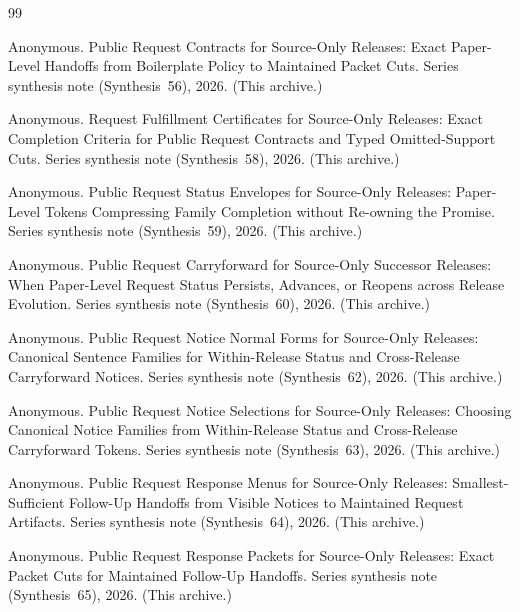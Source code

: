 \documentclass[11pt]{article}
\begin{document}
\begin{thebibliography}{99}\small

Anonymous.
\newblock Public Request Contracts for Source-Only Releases: Exact Paper-Level Handoffs from Boilerplate Policy to Maintained Packet Cuts.
\newblock Series synthesis note (Synthesis~56), 2026. (This archive.)

Anonymous.
\newblock Request Fulfillment Certificates for Source-Only Releases: Exact Completion Criteria for Public Request Contracts and Typed Omitted-Support Cuts.
\newblock Series synthesis note (Synthesis~58), 2026. (This archive.)

Anonymous.
\newblock Public Request Status Envelopes for Source-Only Releases: Paper-Level Tokens Compressing Family Completion without Re-owning the Promise.
\newblock Series synthesis note (Synthesis~59), 2026. (This archive.)

Anonymous.
\newblock Public Request Carryforward for Source-Only Successor Releases: When Paper-Level Request Status Persists, Advances, or Reopens across Release Evolution.
\newblock Series synthesis note (Synthesis~60), 2026. (This archive.)

Anonymous.
\newblock Public Request Notice Normal Forms for Source-Only Releases: Canonical Sentence Families for Within-Release Status and Cross-Release Carryforward Notices.
\newblock Series synthesis note (Synthesis~62), 2026. (This archive.)

Anonymous.
\newblock Public Request Notice Selections for Source-Only Releases: Choosing Canonical Notice Families from Within-Release Status and Cross-Release Carryforward Tokens.
\newblock Series synthesis note (Synthesis~63), 2026. (This archive.)

Anonymous.
\newblock Public Request Response Menus for Source-Only Releases: Smallest-Sufficient Follow-Up Handoffs from Visible Notices to Maintained Request Artifacts.
\newblock Series synthesis note (Synthesis~64), 2026. (This archive.)

Anonymous.
\newblock Public Request Response Packets for Source-Only Releases: Exact Packet Cuts for Maintained Follow-Up Handoffs.
\newblock Series synthesis note (Synthesis~65), 2026. (This archive.)


\end{thebibliography}
\end{document}
